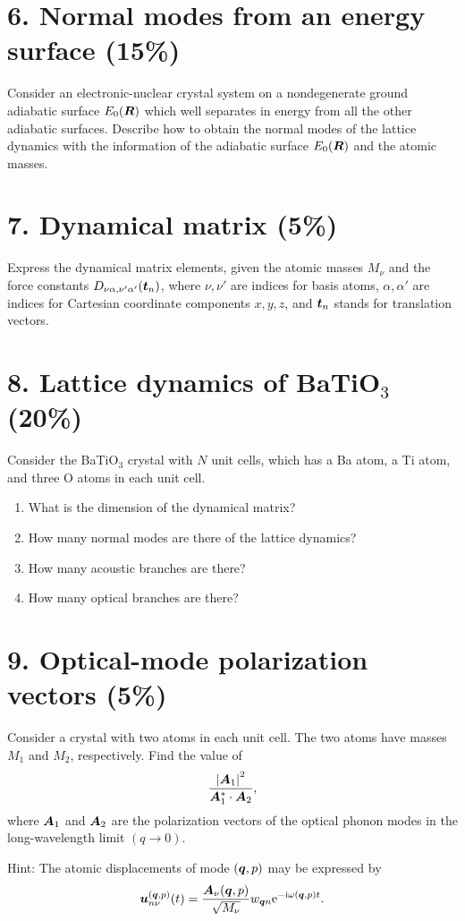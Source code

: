 \section*{6. Normal modes from an energy surface (15\%)}
Consider an electronic-nuclear crystal system on a nondegenerate ground adiabatic surface $E_0(\boldsymbol{R})$ which well separates in energy from all the other adiabatic surfaces. Describe how to obtain the normal modes of the lattice dynamics with the information of the adiabatic surface $E_0(\boldsymbol{R})$ and the atomic masses.

\section*{7. Dynamical matrix (5\%)}
Express the dynamical matrix elements, given the atomic masses $M_\nu$ and the force constants
$D_{\nu\alpha,\nu'\alpha'}(\boldsymbol{t}_n)$,
where $\nu,\nu'$ are indices for basis atoms, $\alpha,\alpha'$ are indices for Cartesian coordinate components $x,y,z$, and $\boldsymbol{t}_n$ stands for translation vectors.

\section*{8. Lattice dynamics of BaTiO$_3$ (20\%)}
Consider the BaTiO$_3$ crystal with $N$ unit cells, which has a Ba atom, a Ti atom, and three O atoms in each unit cell.
\begin{enumerate}[label=(\alph*)]
\item What is the dimension of the dynamical matrix?
\item How many normal modes are there of the lattice dynamics?
\item How many acoustic branches are there?
\item How many optical branches are there?
\end{enumerate}

\section*{9. Optical-mode polarization vectors (5\%)}
Consider a crystal with two atoms in each unit cell. The two atoms have masses $M_1$ and $M_2$, respectively. Find the value of
\[
\frac{\left|\boldsymbol{A}_1\right|^2}{\boldsymbol{A}_1^*\cdot\boldsymbol{A}_2},
\]
where $\boldsymbol{A}_1$ and $\boldsymbol{A}_2$ are the polarization vectors of the optical phonon modes in the long-wavelength limit $(q\to0)$.

Hint: The atomic displacements of mode $(\boldsymbol{q},p)$ may be expressed by
\[
\boldsymbol{u}_{n\nu}^{(\boldsymbol{q},p)}(t)
=\frac{\boldsymbol{A}_\nu(\boldsymbol{q},p)}{\sqrt{M_\nu}}
w_{\boldsymbol{q} n}\mathrm{e}^{-\mathrm{i}\omega(\boldsymbol{q},p)t}.
\]
